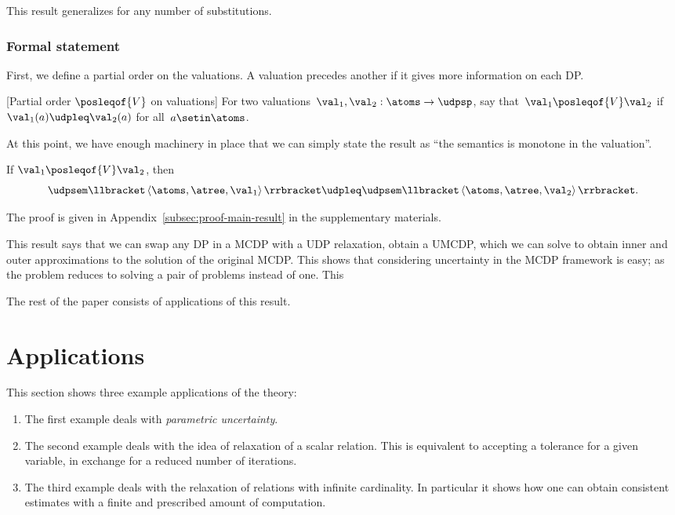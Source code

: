 This result generalizes for any number of substitutions.

\subsubsection*{Formal statement}

First, we define a partial order on the valuations.
A valuation precedes
another if it gives more information on each DP.
\begin{definition}
    \label{def:For-two-valuations}
    [Partial order $\posleqof{V}$ on valuations]
    For two valuations~$\val_{1},\val_{2}:\atoms\rightarrow\udpsp$,
    say that~$\val_{1}\posleqof{V}\val_{2}$ if~$\val_{1}(a)\udpleq\val_{2}(a)$
    for all~$a\setin\atoms$.
\end{definition}
At this point, we have enough machinery in place that we can simply
state the result as ``the semantics is monotone in the valuation''.
\begin{theorem}
    \label{thm:udpsem-monotone}
    If $\val_{1}\posleqof{V}\val_{2}$, then
    \[
        \udpsem\llbracket\left\langle \atoms,\atree,\val_{1}\right\rangle \rrbracket\udpleq\udpsem\llbracket\left\langle \atoms,\atree,\val_{2}\right\rangle \rrbracket.
    \]
\end{theorem}
The proof is given in Appendix~\cref{subsec:proof-main-result}
in the supplementary materials.

This result says that we can swap any DP in a MCDP with a UDP relaxation,
obtain a UMCDP, which we can solve to obtain inner and outer approximations
to the solution of the original MCDP.
This shows that considering
uncertainty in the MCDP framework is easy; as the problem reduces
to solving a pair of problems instead of one.
This

The rest of the paper consists of applications of this result.

\section{Applications\label{sec:Applications}}

This section shows three example applications of the theory:
\begin{enumerate}
    \item The first example deals with \emph{parametric uncertainty}.
    \item The second example deals with the idea of relaxation of a scalar relation.
          This is equivalent to accepting a tolerance for a given variable,
          in exchange for a reduced number of iterations.
    \item The third example deals with the relaxation of relations with infinite
          cardinality.
          In particular it shows how one can obtain consistent
          estimates with a finite and prescribed amount of computation.
\end{enumerate}

